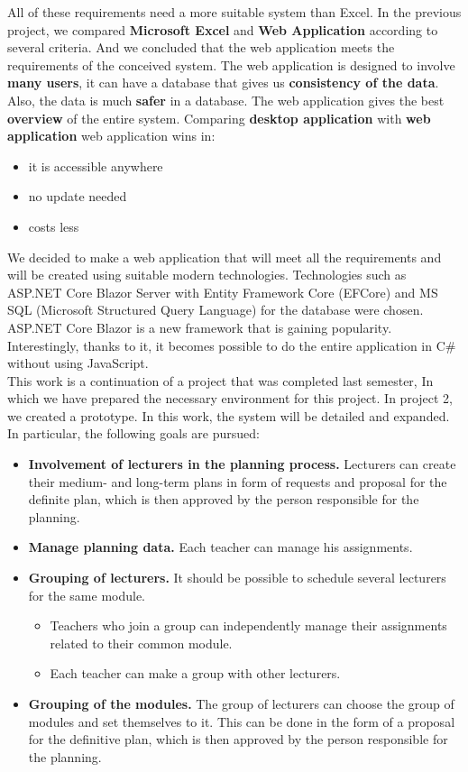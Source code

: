 \documentclass{scrartcl}
\begin{document}
 All of these requirements need a more suitable system than Excel.
In the previous project, we compared \textbf{Microsoft Excel} and \textbf{Web Application} according to several criteria. And we concluded that the web application meets the requirements of the conceived system. The web application is designed to involve \textbf{many users}, it can have a  database that gives us \textbf{consistency of the data}. Also, the data is much \textbf{safer} in a database. The web application gives the best \textbf{overview} of the entire system. Comparing \textbf{desktop application} with \textbf{web application} web application wins in:
\begin{itemize}
\item it is accessible anywhere
\item no update needed 
\item costs less 
\end{itemize} 
 We decided to make a web application that will meet all the requirements and will be created using suitable modern technologies. Technologies such as ASP.NET Core Blazor Server with Entity Framework Core (EFCore) and MS SQL (Microsoft Structured Query Language) for the database were chosen. ASP.NET Core Blazor is a new framework that is gaining popularity. Interestingly, thanks to it, it becomes possible to do the entire application in C\# without using JavaScript.\\
This work is a continuation of a project that was completed last semester, In which we have prepared the necessary environment for this project.
In project 2, we created a prototype. In this work, the system will be detailed and expanded. In particular, the following goals are pursued:
\begin{itemize}
\item \textbf{Involvement of lecturers in the planning process.}
Lecturers can create their medium- and long-term plans in form of requests and proposal for the definite plan, which is then approved by the person responsible for the planning.
\item \textbf{Manage planning data.} Each teacher can manage his assignments.
\item \textbf{Grouping of lecturers.} It should be possible to schedule several lecturers for the same module.
   \begin{itemize}
   \item Teachers who join a group can independently manage their assignments related to their common module.
   \item Each teacher can make a group with other lecturers.
   \end{itemize}
 \item \textbf{Grouping of the modules.} The group of lecturers can choose the group of modules and set themselves to it. This can be done in the form of a proposal for the definitive plan, which is then approved by the person responsible for the planning.
\end{itemize}
\end{document}

